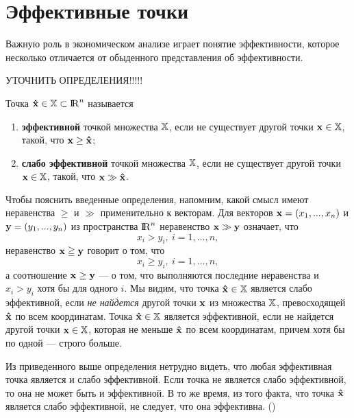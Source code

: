 \newpage

\section{Эффективные точки}

Важную роль в экономическом анализе играет понятие эффективности,
которое несколько отличается от обыденного представления об
эффективности.


УТОЧНИТЬ ОПРЕДЕЛЕНИЯ!!!!!

\begin{dfn}

    Точка ${\mathbf{\hat x}} \in \mathbb{X} \subset {\rm I\!R}^n$ называется

\begin{enumerate}
  \item \textbf{эффективной} точкой множества $\mathbb{X}$, если не существует другой точки $\mathbf{x} \in
\mathbb{X}$, такой, что $\mathbf{x} \geq \mathbf{\hat x}$;

  \item \textbf{слабо эффективной} точкой
множества $\mathbb{X}$, если не существует другой точки $\mathbf{x} \in
\mathbb{X}$, такой, что $\mathbf{x} \gg \mathbf{\hat x}$.

\end{enumerate}
\end{dfn}

    Чтобы пояснить введенные определения, напомним, какой смысл
    имеют неравенства $\geq$ и $\gg$ применительно к векторам. Для
    векторов $\mathbf{x}=(x_{1},...,x_{n})$ и $\mathbf{y}=(y_{1},...,y_{n})$
    из пространства ${\rm I\!R}^{n}$ неравенство $\mathbf{x}\gg\mathbf{y}$
    означает, что
\[
    x_{i}>y_{i}, \ i=1,...,n,
\]
    неравенство $\mathbf{x}\geqq\mathbf{y}$ говорит о том, что
\[
    x_{i}\geqslant y_{i}, \ i=1,...,n,
\]
    а соотношение $\mathbf{x}\geq\mathbf{y}$ --- о том, что выполняются последние неравенства и $x_{i}>y_{i}$
    хотя бы для одного $i$.
    Мы видим, что точка
    ${\mathbf{\hat x}} \in \mathbb{X}$ является слабо эффективной, если \emph{не
    найдется} другой точки $\mathbf{x}$ из множества $\mathbb{X}$,
    превосходящей ${\mathbf{\hat x}}$ по всем координатам. Точка
    ${\mathbf{\hat x}} \in \mathbb{X}$ является эффективной, если не найдется другой
    точки $\mathbf{x}\in\mathbb{X}$, которая не меньше ${\mathbf{\hat x}}$ по
    всем координатам, причем хотя бы по одной --- строго больше.






Из приведенного выше определения нетрудно видеть, что любая эффективная точка является и
слабо эффективной. Если точка не является слабо эффективной, то она не может быть и
эффективной. В то же время, из того факта, что точка ${\mathbf{\hat x}}$ является слабо
эффективной, не следует, что она эффективна. ()





